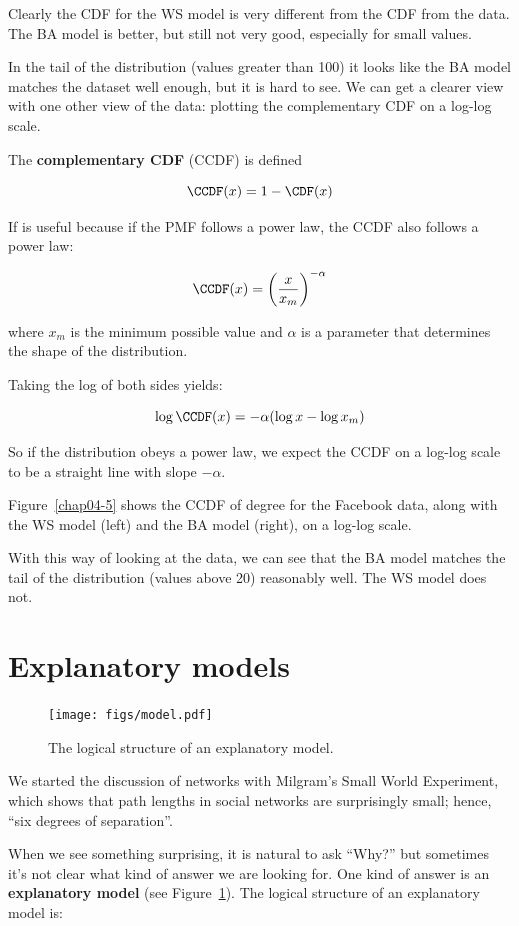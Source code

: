 \documentclass[12pt]{book}
\theoremstyle{exercise}
\begin{document}
Clearly the CDF for the WS model is very different from the CDF
from the data.  The BA model is better, but still not very good,
especially for small values.

In the tail of the distribution (values greater than 100) it looks
like the BA model matches the dataset well enough, but it is
hard to see.  We can get a clearer view with one other view of the
data: plotting the complementary CDF on a log-log scale.

The {\bf complementary CDF} (CCDF) is defined

\[ \CCDF(x) = 1 - \CDF(x) \]

If is useful because if the PMF follows a power law, the CCDF 
also follows a power law:

\[ \CCDF(x) = \left( \frac{x}{x_m} \right)^{-\alpha} \]

where $x_m$ is the minimum possible value and $\alpha$ is a parameter
that determines the shape of the distribution.

Taking the log of both sides yields:

\[ \log \CCDF(x) = -\alpha (\log x - \log x_m) \]

So if the distribution obeys a power law, we expect the CCDF on
a log-log scale to be a straight line with slope $-\alpha$.

Figure~\ref{chap04-5} shows the CCDF of degree for the Facebook data,
along with the WS model (left) and the BA model (right), on a log-log
scale.

With this way of looking at the data, we can see that the BA model
matches the tail of the distribution (values above 20) reasonably well.
The WS model does not.



\section{Explanatory models}
\label{model1}

\begin{figure}
\centerline{\texttt{[image: figs/model.pdf]}}
\caption{The logical structure of an explanatory model.\label{fig.model}}
\end{figure}

We started the discussion of networks with Milgram's Small World
Experiment, which shows that path lengths in social
networks are surprisingly small; hence, ``six degrees of separation''.

When we see something surprising, it is natural to ask ``Why?''  but
sometimes it's not clear what kind of answer we are looking for.  One
kind of answer is an {\bf explanatory model} (see
Figure~\ref{fig.model}).  The logical structure of an explanatory
model is: 
\end{document}
